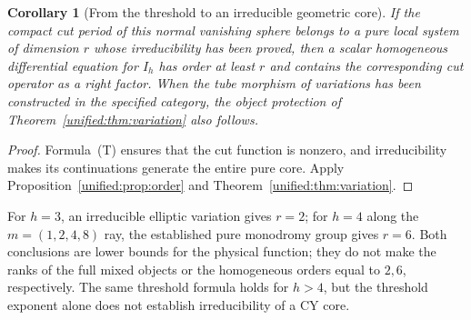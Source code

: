 \documentclass[11pt,a4paper,oneside]{article}
\theoremstyle{plain}
\newtheorem{corollary}[theorem]{Corollary}
\theoremstyle{definition}
\theoremstyle{remark}
\numberwithin{equation}{section}
\begin{document}
\begin{corollary}[From the threshold to an irreducible geometric core]\label{unified:cor:banana-threshold}
If the compact cut period of this normal vanishing sphere belongs to a pure local system of dimension $r$ whose irreducibility has been proved,
then a scalar homogeneous differential equation for $I_h$ has order at least $r$ and contains the corresponding cut operator as a right factor.
When the tube morphism of variations has been constructed in the specified category, the object protection of Theorem~\ref{unified:thm:variation} also follows.
\end{corollary}
\begin{proof}
Formula~(T) ensures that the cut function is nonzero, and irreducibility makes its continuations generate the entire pure core.
Apply Proposition~\ref{unified:prop:order} and Theorem~\ref{unified:thm:variation}.
\end{proof}
For $h=3$, an irreducible elliptic variation gives $r=2$;
for $h=4$ along the $m=(1,2,4,8)$ ray, the established pure monodromy group gives $r=6$.
Both conclusions are lower bounds for the physical function; they do not make the ranks of the full mixed objects or the homogeneous orders equal to $2,6$, respectively.
The same threshold formula holds for $h>4$, but the threshold exponent alone does not establish irreducibility of a CY core.
\end{document}
